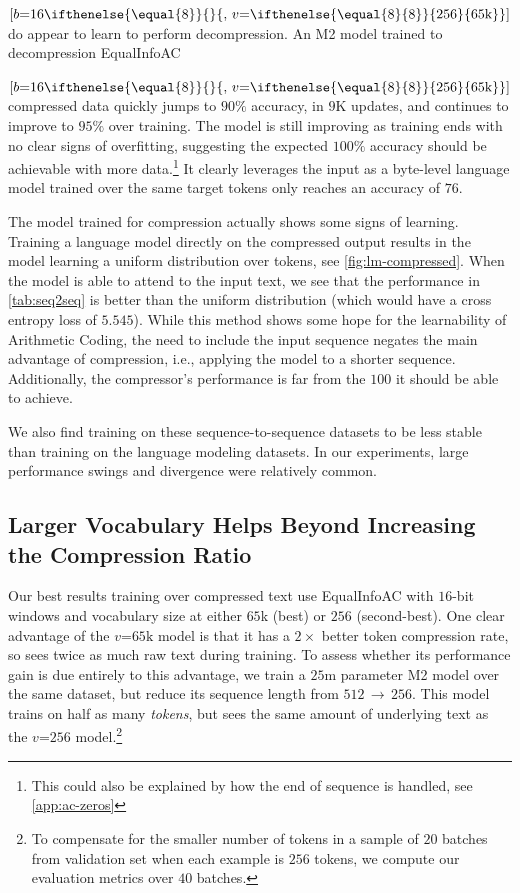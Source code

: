   {$[b\mathord{=}16\ifthenelse{\equal{8}}{}{,\,v\mathord{=}\ifthenelse{\equal{8}{8}}{256}{65\text{k}}}]$} do appear to learn to perform decompression. An M2 model trained to decompression EqualInfoAC

  {$[b\mathord{=}16\ifthenelse{\equal{8}}{}{,\,v\mathord{=}\ifthenelse{\equal{8}{8}}{256}{65\text{k}}}]$} compressed data quickly jumps to $90\%$ accuracy, in $9$K updates, and continues to improve to $95\%$ over training. The model is still improving as training ends with no clear signs of overfitting, suggesting the expected $100\%$ accuracy should be achievable with more data.\footnote{This could also be explained by how the end of sequence is handled, see \ref{app:ac-zeros}} It clearly leverages the input as a byte-level language model trained over the same target tokens only reaches an accuracy of $76$.

The model trained for compression actually shows some signs of learning. Training a language model directly on the compressed output results in the model learning a uniform distribution over tokens, see \ref{fig:lm-compressed}. When the model is able to attend to the input text, we see that the performance in \ref{tab:seq2seq} is better than the uniform distribution (which would have a cross entropy loss of $5.545$). While this method shows some hope for the learnability of Arithmetic Coding, the need to include the input sequence negates the main advantage of compression, i.e., applying the model to a shorter sequence. Additionally, the compressor's performance is far from the $100$ it should be able to achieve.

We also find training on these sequence-to-sequence datasets to be less stable than training on the language modeling datasets. In our experiments, large performance swings and divergence were relatively common.

\subsection{Larger Vocabulary Helps Beyond Increasing the Compression Ratio}
\label{sec:vocabulary-ablation}

Our best results training over compressed text use EqualInfoAC with $16$-bit windows and vocabulary size at either $65$k (best) or $256$ (second-best). One clear advantage of the $v\mathord{=}65\text{k}$ model is that it has a $2\times$ better token compression rate, so sees twice as much raw text during training. To assess whether its performance gain is due entirely to this advantage, we train a $25$m parameter M2 model over the same dataset, but reduce its sequence length from $512$\,$\rightarrow$\,$256$. This model trains on half as many \emph{tokens}, but sees the same amount of underlying text as the $v\mathord{=}256$ model.\footnote{To compensate for the smaller number of tokens in a sample of $20$ batches from validation set when each example is $256$ tokens, we compute our evaluation metrics over $40$ batches.}

